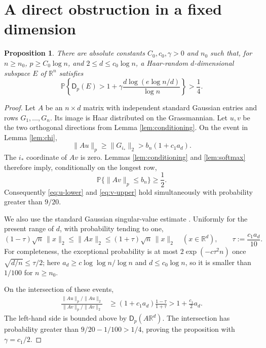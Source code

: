\documentclass[11pt]{article}
\newtheorem{proposition}[theorem]{Proposition}
\newcommand{\R}{\mathbb R}
\newcommand{\Dist}{\mathsf D}
\newcommand{\Prob}{\mathbb P}
\begin{document}
\section{A direct obstruction in a fixed dimension}

\begin{proposition}\label{prop:direct}
There are absolute constants $C_0,c_0,\gamma>0$ and $n_0$ such that, for
$n\ge n_0$, $p\ge C_0\log n$, and $2\le d\le c_0\log n$, a Haar-random
$d$-dimensional subspace $E$ of $\R^n$ satisfies
\[
 \Prob\left\{\Dist_p(E)>1+\gamma
       \frac{d\log(e\log n/d)}{\log n}\right\}>\frac14.
\]
\end{proposition}

\begin{proof}
Let $A$ be an $n\times d$ matrix with independent standard Gaussian entries
and rows $G_1,\ldots,G_n$.  Its image is Haar distributed on the
Grassmannian.  Let $u,v$ be the two orthogonal directions from
Lemma \ref{lem:conditioning}.  On the event in Lemma \ref{lem:chi},
\begin{equation}\label{eq:u-lower}
       \|Au\|_p\ge\|G_{i_*}\|_2>b_n(1+c_1a_d).
\end{equation}
The $i_*$ coordinate of $Av$ is zero.  Lemmas \ref{lem:conditioning} and
\ref{lem:softmax} therefore imply, conditionally on the longest row,
\begin{equation}\label{eq:v-upper}
       \Prob\{\|Av\|_p\le b_n\}\ge\frac12.
\end{equation}
Consequently \eqref{eq:u-lower} and \eqref{eq:v-upper} hold simultaneously
with probability greater than $9/20$.

We also use the standard Gaussian singular-value estimate
\cite[Theorem 4.6.1]{Vershynin18}.  Uniformly for the present range of $d$,
with probability tending to one,
\begin{equation}\label{eq:gram}
 (1-\tau)\sqrt n\,\|x\|_2\le\|Ax\|_2
 \le(1+\tau)\sqrt n\,\|x\|_2
 \quad(x\in\R^d),
 \qquad \tau:=\frac{c_1a_d}{10}.
\end{equation}
For completeness, the exceptional probability is at most
$2\exp(-c\tau^2n)$ once $\sqrt{d/n}\le\tau/2$; here
$a_d\ge c\log\log n/\log n$ and $d\le c_0\log n$, so it is smaller than
$1/100$ for $n\ge n_0$.

On the intersection of these events,
\begin{align*}
 \frac{\|Au\|_p/\|Au\|_2}{\|Av\|_p/\|Av\|_2}
 &\ge (1+c_1a_d)\frac{1-\tau}{1+\tau}
 >1+\frac{c_1}{2}a_d.
\end{align*}
The left-hand side is bounded above by $\Dist_p(A\R^d)$.  The intersection
has probability greater than $9/20-1/100>1/4$, proving the proposition with
$\gamma=c_1/2$.
\end{proof}
\end{document}
